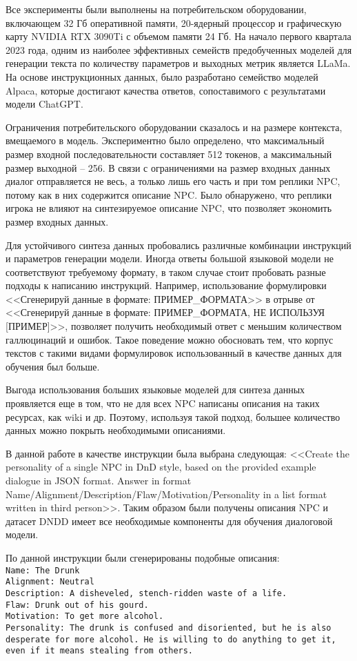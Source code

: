 Все эксперименты были выполнены на потребительском оборудовании, включающем 32 Гб оперативной памяти, 20-ядерный процессор и графическую карту NVIDIA RTX 3090Ti с объемом памяти 24 Гб. На начало первого квартала 2023 года, одним из наиболее эффективных семейств предобученных моделей для генерации текста по количеству параметров и выходных метрик является LLaMa. На основе инструкционных данных, было разработано семейство моделей Alpaca, которые достигают качества ответов, сопоставимого с результатами модели ChatGPT.

Ограничения потребительского оборудовании сказалось и на размере контекста, вмещаемого в модель. Экспериментно было определено, что максимальный размер входной последовательности составляет 512 токенов, а максимальный размер выходной -- 256. В связи с ограничениями на размер входных данных диалог отправляется не весь, а только лишь его часть и при том реплики NPC, потому как в них содержится описание NPC. Было обнаружено, что реплики игрока не влияют на синтезируемое описание NPC, что позволяет экономить размер входных данных. 

Для устойчивого синтеза данных пробовались различные комбинации инструкций и параметров генерации модели. Иногда ответы большой языковой модели не соответствуют требуемому формату, в таком случае стоит пробовать разные подходы к написанию инструкций. Например, использование формулировки <<Сгенерируй данные в формате: ПРИМЕР\_ФОРМАТА>> в отрыве от <<Сгенерируй данные в формате: ПРИМЕР\_ФОРМАТА, НЕ ИСПОЛЬЗУЯ [ПРИМЕР]>>, позволяет получить необходимый ответ с меньшим количеством галлюцинаций и ошибок. Такое поведение можно обосновать тем, что корпус текстов с такими видами формулировок использованный в качестве данных для обучения был больше.

Выгода использования больших языковые моделей для синтеза данных проявляется еще в том, что не для всех NPC написаны описания на таких ресурсах, как wiki и др. Поэтому, используя такой подход, большее количество данных можно покрыть необходимыми описаниями.

В данной работе в качестве инструкции была выбрана следующая: <<Create the personality of a single NPC in DnD style, based on the provided example dialogue in JSON format. Answer in format Name/Alignment/Description/Flaw/Motivation/Personality in a list format written in third person>>. Таким образом были получены описания NPC и датасет DNDD имеет все необходимые компоненты для обучения диалоговой модели.

По данной инструкции были сгенерированы подобные описания: \texttt{\\Name: The Drunk\\
      Alignment: Neutral\\
      Description: A disheveled, stench-ridden waste of a life.\\
      Flaw: Drunk out of his gourd.\\
      Motivation: To get more alcohol.\\
      Personality: The drunk is confused and disoriented, but he is also desperate for more alcohol. He is willing to do anything to get it, even if it means stealing from others.}

